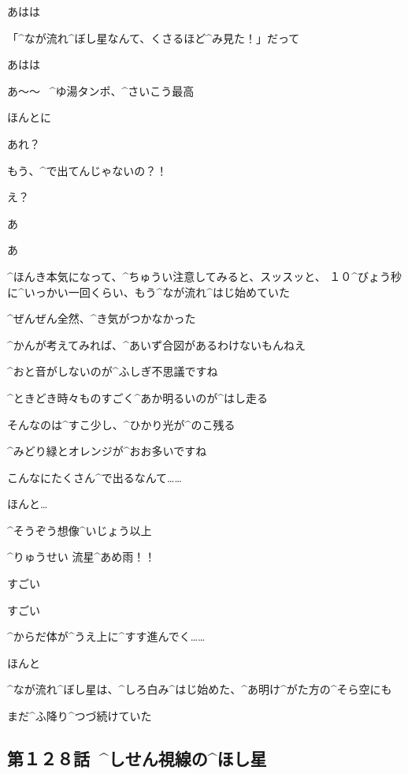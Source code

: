 \Kokone あはは

\Alpha 「^{なが}{流}れ^{ぼし}{星}なんて、くさるほど^{み}{見}た！」だって

\Kokone あはは

\page[106]
\Alpha あ〜〜
\ ^{ゆ}{湯}タンポ、^{さいこう}{最高}

\Kokone ほんとに

\page[107]
\Alpha あれ？

\Alpha もう、^{で}{出}てんじゃないの？！

\Kokone え？

\Alpha あ

\Kokone あ

\page[108]
\Alpha ^{ほんき}{本気}になって、^{ちゅうい}{注意}してみると、スッスッと、
１０^{びょう}{秒}に^{いっかい}{一回}くらい、もう^{なが}{流}れ^{はじ}{始}めていた

\Alpha ^{ぜんぜん}{全然}、^{き}{気}がつかなかった

\Alpha ^{かんが}{考}えてみれば、^{あいず}{合図}があるわけないもんねえ

\Kokone ^{おと}{音}がしないのが^{ふしぎ}{不思議}ですね

\page[109]
\Alpha ^{ときどき}{時々}ものすごく^{あか}{明}るいのが^{はし}{走}る

\Alpha そんなのは^{すこ}{少}し、^{ひかり}{光}が^{のこ}{残}る

\Kokone ^{みどり}{緑}とオレンジが^{おお}{多}いですね

\Kokone こんなにたくさん^{で}{出}るなんて……

\Alpha ほんと…

\Alpha ^{そうぞう}{想像}^{いじょう}{以上}

\page[112]
\Alpha ^{りゅうせい }{流星}^{あめ}{雨}！！

\Alpha すごい

\Kokone すごい

\page[113]
\Alpha ^{からだ}{体}が^{うえ}{上}に^{すす}{進}んでく……

\Kokone ほんと

\page[114]
\Alpha ^{なが}{流}れ^{ぼし}{星}は、^{しろ}{白}み^{はじ}{始}めた、^{あ}{明}け^{がた}{方}の^{そら}{空}にも

\Alpha まだ^{ふ}{降}り^{つづ}{続}けていた


\subsection{第１２８話\ ^{しせん}{視線}の^{ほし}{星}}


